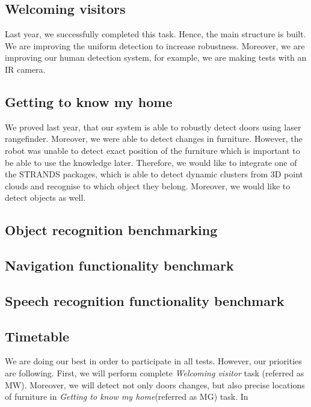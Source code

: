 \subsection{Welcoming visitors}

Last year, we successfully completed this task. Hence, the main structure is built. We are improving the uniform detection to increase robustness. 
Moreover, we are improving our human detection system, for example, we are making tests with an IR camera.

\subsection{Getting to know my home}

We proved last year, that our system is able to robustly detect doors using laser rangefinder. Moreover, we were able to detect changes in furniture. However, the robot was unable to detect exact position of the furniture which is important to be able to use the knowledge later. 
Therefore, we would like to integrate one of the STRANDS packages, which is able to detect dynamic clusters from 3D point clouds and recognise to which object they belong. 
Moreover, we would like to detect objects as well.

\subsection{Object recognition benchmarking} %

\subsection{Navigation functionality benchmark}

\subsection{Speech recognition functionality benchmark}

\subsection{Timetable}

We are doing our best in order to participate in all tests. However, our priorities are following.
First, we will perform complete \textit{Welcoming visitor} task (referred as MW). 
Moreover, we will detect not only doors changes, but also precise locations of furniture in \textit{Getting to know my home}(referred as MG) task. 
In \textit{}

